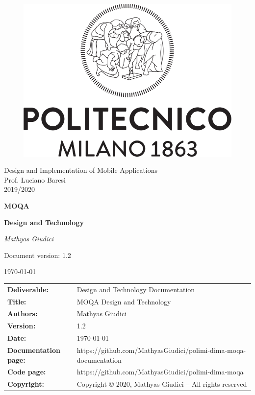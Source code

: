 \documentclass[a4paper,12pt]{report}
\begin{document}
\begin{titlepage}
\centering
	\begin{center}{
		\begin{figure}[h]
		\large
		\centering
		{\includegraphics[width=.70\linewidth]{img/logo_poli}}
        \end{figure}
    	}
	\end{center}
	\vspace{1 cm}
	{\Large { Design and Implementation of Mobile Applications \\ Prof. Luciano Baresi \\ 2019/2020} \par}
	\vspace{1.5cm}
	{\textbf{\LARGE MOQA} \par}
	{\LARGE \textbf{Design and Technology} \par}
	{\Large\itshape Mathyas Giudici\par}
	\vfill
	{\large Document version: 1.2\par}
	{\large \today \par}
\end{titlepage}

{
\pagestyle{empty}
\begin{table}[h!]
    \begin{tabu} to \textwidth { X[0.35,r,p] X[0.65,l,p] }
        \textbf{Deliverable:} & Design and Technology Documentation\\
        \textbf{Title:} & MOQA Design and Technology \\
        \textbf{Authors:} & Mathyas Giudici\\
        \textbf{Version:} & 1.2 \\
        \textbf{Date:} & \today \\
        \textbf{Documentation page:} &
        https://github.com/MathyasGiudici/polimi-dima-moqa-documentation \\
        \textbf{Code page:} & https://github.com/MathyasGiudici/polimi-dima-moqa \\
        \textbf{Copyright:} & Copyright © 2020, Mathyas Giudici – All rights reserved \\
    \end{tabu}
\end{table}

\clearpage
}
\end{document}
